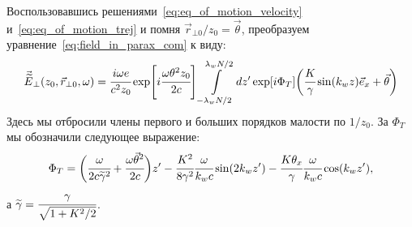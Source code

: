 Воспользовавшись решениями~\ref{eq:eq_of_motion_velocity} и~\ref{eq:eq_of_motion_trej} и помня $\vec{r}_{\bot 0}/z_0 = \vec{\theta}$, преобразуем уравнение~\ref{eq:field_in_parax_com} к виду:
\begin{equation}
	\label{eq:field_in_parax}
	\begin{array}{lcl}
		\vec{\widetilde{E}}_{\bot}(z_0,  \vec{r}_{\bot 0}, \omega) =
		\cfrac{i\omega e}{c^2z_0} \exp[i\cfrac{\omega \theta^2 z_0}{2c}]
	 	\displaystyle\int\limits_{-\lambda_w N/2}^{\lambda_w N/2} dz'\exp[i\Phi_T]
		\bigg(\cfrac{K}{\gamma}\sin(k_w z)\vec{e}_x + \vec{\theta}\bigg)
	\end{array}	
\end{equation}
Здесь мы отбросили члены первого и больших порядков малости по $1/z_0$. За $\Phi_T$ мы обозначили следующее выражение:
\begin{equation}
	\Phi_T = 
	\bigg(\cfrac{\omega}{2c\widetilde{\gamma}^2} + 
	\cfrac{\omega\vec{\theta}^2}{2c}\bigg)z' - 
	\cfrac{K^2}{8\gamma^2}\cfrac{\omega}{k_w c}\sin(2k_wz') - \cfrac{K{\theta_x}}{\gamma}\cfrac{\omega}{k_w c}\cos(k_w z'),
\end{equation}
а $\widetilde{\gamma} = \cfrac{\gamma}{\sqrt{1 + K^2/2}}$.\\

